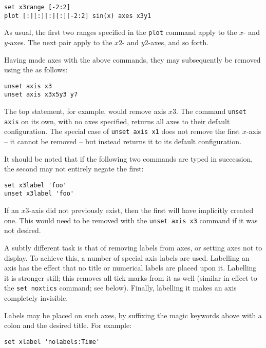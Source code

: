 \begin{verbatim}
set x3range [-2:2]
plot [:][:][:][:][-2:2] sin(x) axes x3y1
\end{verbatim}

\noindent As usual, the first two ranges specified in the {\tt plot} command
apply to the $x$- and $y$-axes. The next pair apply to the $x2$- and $y2$-axes,
and so forth.

 Having made axes
with the above commands, they may subsequently be removed using the
 as follows:

\begin{verbatim}
unset axis x3
unset axis x3x5y3 y7
\end{verbatim}

\noindent The top statement, for example, would remove axis $x3$. The command
{\tt unset axis} on its own, with no axes specified, returns all axes to
their default configuration.  The special case of {\tt unset axis x1} does
not remove the first $x$-axis -- it cannot be removed -- but instead returns it
to its default configuration.

It should be noted that if the following two commands are typed in succession,
the second may not entirely negate the first:

\begin{verbatim}
set x3label 'foo'
unset x3label 'foo'
\end{verbatim}

\noindent If an $x3$-axis did not previously exist, then the first will have
implicitly created one. This would need to be removed with the {\tt unset axis
x3} command if it was not desired.

A subtly different task is that of removing labels from axes, or setting axes
not to display. To achieve this, a number of special axis labels are used.
Labelling an axis  has the effect that no title or numerical
labels are placed upon it. Labelling it  is stronger
still; this removes all tick marks from it as well (similar in effect to the
{\tt set noxtics} command; see below).  Finally, labelling it
 makes an axis completely invisible.

Labels may be placed on such axes, by suffixing the magic keywords above with a
colon and the desired title. For example:

\begin{verbatim}
set xlabel 'nolabels:Time'
\end{verbatim}

